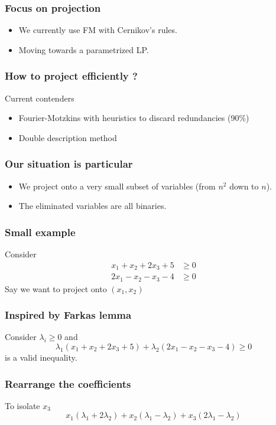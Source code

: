 \documentclass{beamer}
\begin{document}
\begin{frame}
  \frametitle{Focus on projection}
  \begin{itemize}
  \item<1-> We currently use FM with Cernikov's rules.
  \item<2-> Moving towards a parametrized LP.
  \end{itemize}
\end{frame}

\begin{frame}
  \frametitle{How to project efficiently ?}
  Current contenders
  \begin{itemize}
  \item<1-> Fourier-Motzkins with heuristics to discard redundancies (90\%)
  \item<2-> Double description method
  \end{itemize}
\end{frame}

\begin{frame}
  \frametitle{Our situation is particular}
  \begin{itemize}
  \item We project onto a very small subset of variables (from $n^2$ down to $n$).
  \item The eliminated variables are all binaries.
  \end{itemize}
\end{frame}

\begin{frame}
  \frametitle{Small example}
  Consider
  \begin{align*}
    x_1 + x_2 +2x_3 +5 &\ge 0\\
    2x_1 - x_2 - x_3 -4 &\ge 0
  \end{align*}
  Say we want to project onto $(x_1, x_2)$
\end{frame}

\begin{frame}
  \frametitle{Inspired by Farkas lemma}
  Consider $\lambda_i \ge 0$ and
  \begin{displaymath}
    \lambda_1(x_1 + x_2 +2x_3 +5) + \lambda_2 (    2x_1 - x_2 - x_3 -4) \ge 0
  \end{displaymath}
  is a valid inequality.
\end{frame}

\begin{frame}
  \frametitle{Rearrange the coefficients}
  To isolate $x_3$
  \begin{displaymath}
    x_1(\lambda_1 + 2\lambda_2) + x_2(\lambda_1-\lambda_2) + x_3(2\lambda_1-\lambda_2)
  \end{displaymath}
\end{frame}
\end{document}
